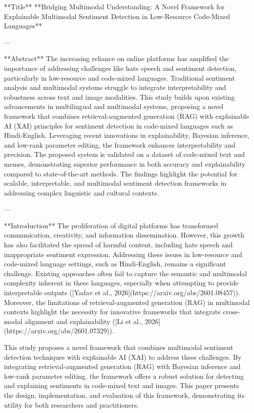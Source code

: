 **Title**  
**Bridging Multimodal Understanding: A Novel Framework for Explainable Multimodal Sentiment Detection in Low-Resource Code-Mixed Languages**

---

**Abstract**  
The increasing reliance on online platforms has amplified the importance of addressing challenges like hate speech and sentiment detection, particularly in low-resource and code-mixed languages. Traditional sentiment analysis and multimodal systems struggle to integrate interpretability and robustness across text and image modalities. This study builds upon existing advancements in multilingual and multimodal systems, proposing a novel framework that combines retrieval-augmented generation (RAG) with explainable AI (XAI) principles for sentiment detection in code-mixed languages such as Hindi-English. Leveraging recent innovations in explainability, Bayesian inference, and low-rank parameter editing, the framework enhances interpretability and precision. The proposed system is validated on a dataset of code-mixed text and memes, demonstrating superior performance in both accuracy and explainability compared to state-of-the-art methods. The findings highlight the potential for scalable, interpretable, and multimodal sentiment detection frameworks in addressing complex linguistic and cultural contexts.

---

**Introduction**  
The proliferation of digital platforms has transformed communication, creativity, and information dissemination. However, this growth has also facilitated the spread of harmful content, including hate speech and inappropriate sentiment expression. Addressing these issues in low-resource and code-mixed language settings, such as Hindi-English, remains a significant challenge. Existing approaches often fail to capture the semantic and multimodal complexity inherent in these languages, especially when attempting to provide interpretable outputs ([Yadav et al., 2026](https://arxiv.org/abs/2601.08457)). Moreover, the limitations of retrieval-augmented generation (RAG) in multimodal contexts highlight the necessity for innovative frameworks that integrate cross-modal alignment and explainability ([Li et al., 2026](https://arxiv.org/abs/2601.07329)).

This study proposes a novel framework that combines multimodal sentiment detection techniques with explainable AI (XAI) to address these challenges. By integrating retrieval-augmented generation (RAG) with Bayesian inference and low-rank parameter editing, the framework offers a robust solution for detecting and explaining sentiments in code-mixed text and images. This paper presents the design, implementation, and evaluation of this framework, demonstrating its utility for both researchers and practitioners.

